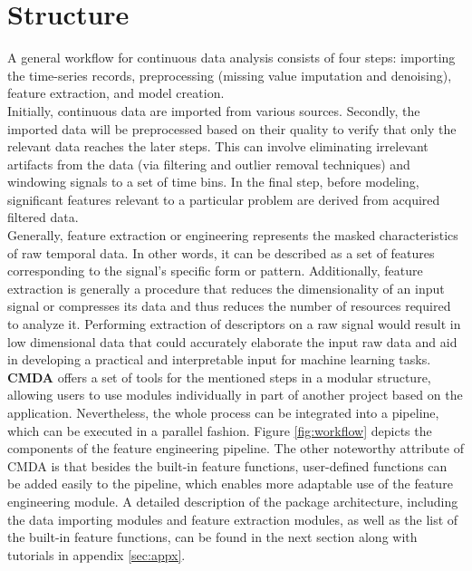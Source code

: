\documentclass{article}
\begin{document}
\section{Structure}
A general workflow for continuous data analysis consists of four steps: importing the time-series records, preprocessing (missing value imputation and denoising), feature extraction, and model creation.\\
Initially, continuous data are imported from various sources. Secondly, the imported data will be preprocessed based on their quality to verify that only the relevant data reaches the later steps. This can involve eliminating irrelevant artifacts from the data (via filtering and outlier removal techniques) and windowing signals to a set of time bins. In the final step, before modeling, significant features relevant to a particular problem are derived from acquired filtered data.\\
Generally, feature extraction or engineering represents the masked characteristics of raw temporal data. In other words, it can be described as a set of features corresponding to the signal's specific form or pattern. Additionally, feature extraction is generally a procedure that reduces the dimensionality of an input signal or compresses its data and thus reduces the number of resources required to analyze it. Performing extraction of descriptors on a raw signal would result in low dimensional data that could accurately elaborate the input raw data and aid in developing a practical and interpretable input for machine learning tasks.\\ 
\textbf{CMDA} offers a set of tools for the mentioned steps in a modular structure, allowing users to use modules individually in part of another project based on the application. Nevertheless, the whole process can be integrated into a pipeline, which can be executed in a parallel fashion.
Figure \ref{fig:workflow} depicts the components of the feature engineering pipeline. The other noteworthy attribute of CMDA is that besides the built-in feature functions, user-defined functions can be added easily to the pipeline, which enables more adaptable use of the feature engineering module.
A detailed description of the package architecture, including the data importing modules and feature extraction modules, as well as the list of the built-in feature functions, can be found in the next section along with tutorials in appendix \ref{sec:appx}.
\end{document}
